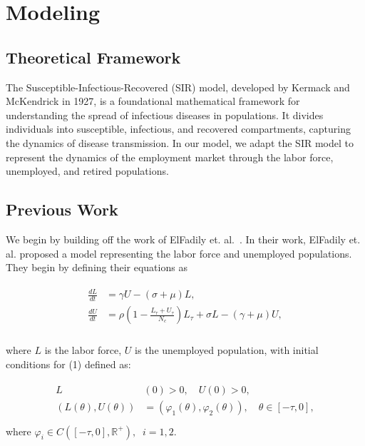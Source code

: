 \documentclass[11pt]{amsart}
\begin{document}
\section{Modeling}

\subsection{Theoretical Framework}

The Susceptible-Infectious-Recovered (SIR) model, developed by Kermack and McKendrick in 1927, 
is a foundational mathematical framework for understanding the spread of infectious diseases in populations. 
It divides individuals into susceptible, infectious, and recovered compartments, capturing the dynamics of disease transmission.
In our model, we adapt the SIR model to represent the dynamics of the employment market through the labor force,
unemployed, and retired populations.

\subsection{Previous Work}

We begin by building off the work of ElFadily et. al.~\cite{ElFadily}. In their work, ElFadily et. al. proposed a model
 representing the labor force and unemployed populations. They begin by defining their equations as

\begin{align}
    \begin{split}
        \frac{dL}{dt} &= \gamma U - (\sigma + \mu)L, \\
        \frac{dU}{dt} &= \rho \left(1 - \frac{L_{\tau} + U_{\tau}}{N_c} \right)L_{\tau} + \sigma L - (\gamma + \mu)U, \\
    \end{split}
\end{align}

where $L$ is the labor force, $U$ is the unemployed population, with initial conditions for (1) defined as:

\begin{align}
    \begin{split}
        L&(0) > 0, \quad U(0) > 0, \\
        (L(\theta),U(\theta)) &= (\varphi_1(\theta), \varphi_2(\theta)), \quad \theta \in [-\tau,0], \\
    \end{split}
\end{align}
where $\varphi_i\in C([-\tau, 0], \mathbb{R}^+),\;\; i=1,2$.
\end{document}

